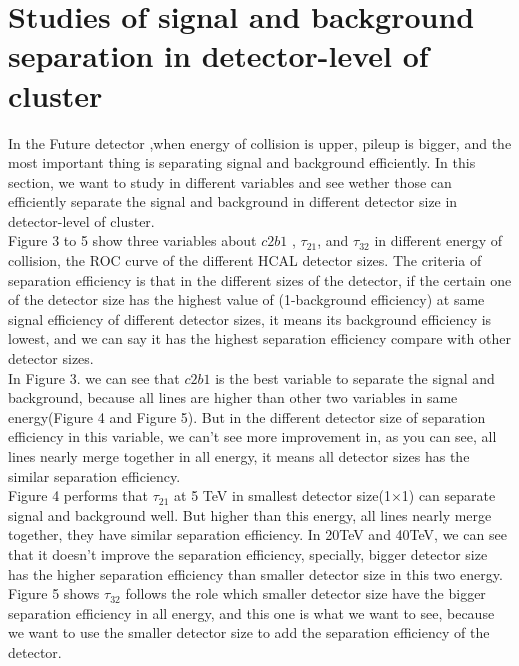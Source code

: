 \section{Studies of signal and background separation in detector-level of cluster}
In the Future detector ,when energy of collision is upper, pileup is bigger, and the most important thing is separating signal and background efficiently. In this section, we want to study in different variables and see wether those can efficiently separate the signal and background in different detector size in detector-level of cluster.\\

Figure 3 to 5 show three variables about $c2b1$ , $\tau_{21}$, and $\tau_{32}$ in different energy of collision, the ROC curve of the different HCAL detector sizes. The criteria of separation efficiency is that in the different sizes of the detector, if the certain one of the detector size has the highest value of (1-background efficiency) at same signal efficiency of different detector sizes, it means its background efficiency is lowest, and we can say it has the highest separation efficiency compare with other detector sizes.\\

In Figure 3. we can see that $c2b1$ is the best variable to separate the signal and background, because all lines are higher than other two variables in same energy(Figure 4 and Figure 5). But in the different detector size of separation efficiency in this variable, we can't see more improvement in, as you can see, all lines nearly merge together in all energy, it means all detector sizes has the similar separation efficiency.\\

Figure 4 performs that $\tau_{21}$ at 5 TeV in smallest detector size(1$\times$1) can separate signal and background well. But higher than this energy, all lines nearly merge together, they have similar separation efficiency. In 20TeV and 40TeV, we can see that it doesn't improve the separation efficiency, specially, bigger detector size has the higher separation efficiency than smaller detector size in this two energy.\\

Figure 5 shows $\tau_{32}$ follows the role which smaller detector size have the bigger separation efficiency in all energy, and this one is what we want to see, because we want to use the smaller detector size to add the separation efficiency of the detector.\\

